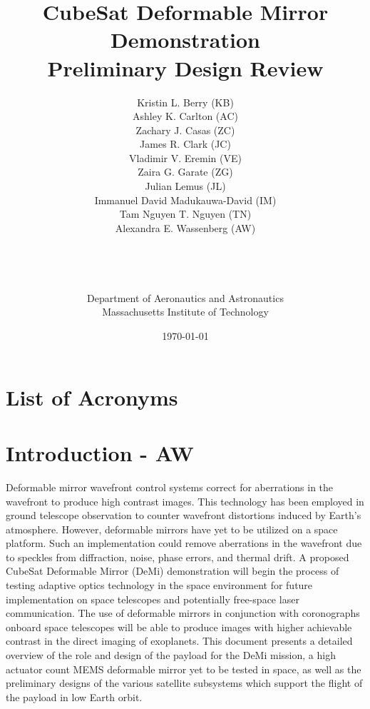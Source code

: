 \documentclass[12pt]{article}
\title{CubeSat Deformable Mirror Demonstration\\Preliminary Design Review\\}
\author{Kristin L. Berry (KB)\\
Ashley K. Carlton (AC)\\
Zachary J. Casas (ZC)\\
James R. Clark (JC)\\
Vladimir V. Eremin (VE)\\ 
Zaira G. Garate (ZG)\\ 
Julian Lemus (JL)\\
Immanuel David Madukauwa-David (IM)\\
Tam Nguyen T. Nguyen (TN)\\
Alexandra E. Wassenberg (AW)\\\\\\\\\\
Department of Aeronautics and Astronautics\\
Massachusetts Institute of Technology\\
}
\date{\today}
\begin{document}
\maketitle
\newpage

\tableofcontents
\listoffigures
\listoftables


\section*{List of Acronyms}
\begin{acronym}


\end{acronym}
\newpage

\section{Introduction - AW}
Deformable mirror wavefront control systems correct for aberrations in the wavefront to produce high contrast images.  This technology has been employed in ground telescope observation to counter wavefront distortions induced by Earth’s atmosphere.  However, deformable mirrors have yet to be utilized on a space platform.  Such an implementation could remove aberrations in the wavefront due to speckles from diffraction, noise, phase errors, and thermal drift.  A proposed CubeSat Deformable Mirror (DeMi) demonstration will begin the process of testing adaptive optics technology in the space environment for future implementation on space telescopes and potentially free-space laser communication.  The use of deformable mirrors in conjunction with coronographs onboard space telescopes will be able to produce images with higher achievable contrast in the direct imaging of exoplanets.  This document presents a detailed overview of the role and design of the payload for the DeMi mission, a high actuator count MEMS deformable mirror yet to be tested in space, as well as the preliminary designs of the various satellite subsystems which support the flight of the payload in low Earth orbit.  
\end{document}
